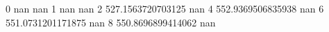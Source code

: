 0 nan nan
1 nan nan
2 527.1563720703125 nan
4 552.9369506835938 nan
6 551.0731201171875 nan
8 550.8696899414062 nan
